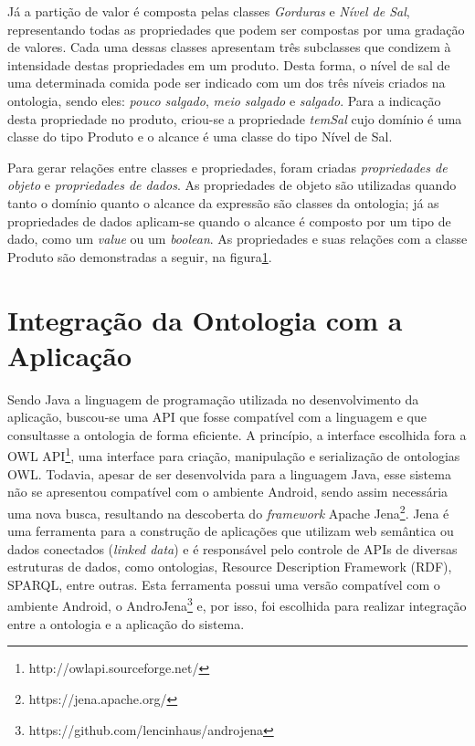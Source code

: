 Já a partição de valor é composta pelas classes \emph{Gorduras} e \emph{Nível de Sal}, representando todas as propriedades que podem ser compostas por uma gradação de valores. Cada uma dessas classes apresentam três subclasses que condizem à intensidade destas propriedades em um produto. Desta forma, o nível de sal de uma determinada comida pode ser indicado com um dos três níveis criados na ontologia, sendo eles: \emph{pouco salgado}, \emph{meio salgado} e \emph{salgado}. Para a indicação desta propriedade no produto, criou-se a propriedade \emph{temSal} cujo domínio é uma classe do tipo Produto e o alcance é uma classe do tipo Nível de Sal. 

Para gerar relações entre classes e propriedades, foram criadas \emph{propriedades de objeto} e \emph{propriedades de dados}. As propriedades de objeto são utilizadas quando tanto o domínio quanto o alcance da expressão são classes da ontologia; já as propriedades de dados aplicam-se quando o alcance é composto por um tipo de dado, como um \emph{value} ou um \emph{boolean}. As propriedades e suas relações com a classe Produto são demonstradas a seguir, na figura\ref{}.
\begin{figure}
\end{figure}

\section{Integração da Ontologia com a Aplicação}

Sendo Java a linguagem de programação utilizada no desenvolvimento da aplicação, buscou-se uma API que fosse compatível com a linguagem e que consultasse a ontologia de forma eficiente. A princípio, a interface escolhida fora a OWL API\footnote{http://owlapi.sourceforge.net/}, uma interface para criação, manipulação e serialização de ontologias OWL. Todavia, apesar de ser desenvolvida para a linguagem Java, esse sistema não se apresentou compatível com o ambiente Android, sendo assim necessária uma nova busca, resultando na descoberta do \emph{framework} Apache Jena\footnote{https://jena.apache.org/}. Jena é uma ferramenta para a construção de aplicações que utilizam web semântica ou dados conectados (\emph{linked data}) e é responsável pelo controle de APIs de diversas estruturas de dados, como ontologias, Resource Description Framework (RDF), SPARQL, entre outras. Esta ferramenta possui uma versão compatível com o ambiente Android, o AndroJena\footnote{https://github.com/lencinhaus/androjena} e, por isso, foi escolhida para realizar integração entre a ontologia e a aplicação do sistema.

